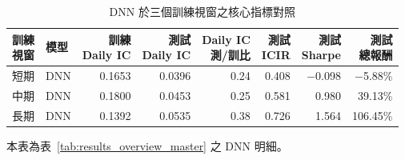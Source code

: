 \begin{table}[H]
\centering
\caption{DNN 於三個訓練視窗之核心指標對照}
\label{tab:results_dnn_detail}
\begingroup
\scriptsize
\setlength{\tabcolsep}{4pt}
\renewcommand{\arraystretch}{1.10}
\begin{adjustbox}{max width=\textwidth}
\begin{tabular}{@{}llrrrrrr@{}}
\toprule
\makecell[l]{訓練\\視窗} & 模型 & \makecell[r]{訓練\\Daily IC} & \makecell[r]{測試\\Daily IC} & \makecell[r]{Daily IC\\測/訓比} & \makecell[r]{測試\\ICIR} & \makecell[r]{測試\\Sharpe} & \makecell[r]{測試\\總報酬} \\
\midrule
短期 & DNN & 0.1653 & 0.0396 & 0.24 & 0.408 & $-$0.098 & $-$5.88\% \\
中期 & DNN & 0.1800 & 0.0453 & 0.25 & 0.581 & 0.980 & 39.13\% \\
長期 & DNN & 0.1392 & 0.0535 & 0.38 & 0.726 & 1.564 & 106.45\% \\
\bottomrule
\end{tabular}
\end{adjustbox}
\smallskip

{\footnotesize 本表為表~\ref{tab:results_overview_master} 之 DNN 明細。}
\endgroup
\end{table}
